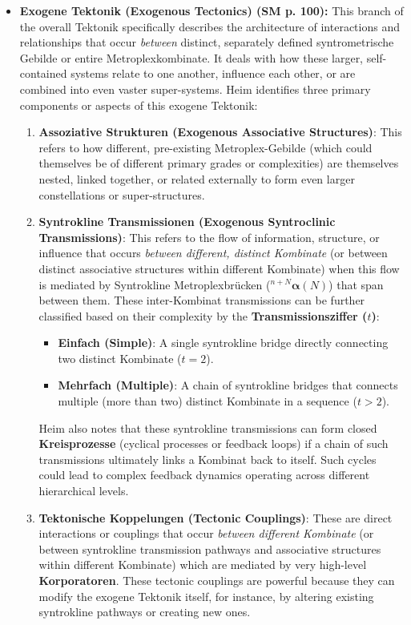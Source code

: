 \documentclass[12pt]{article}
\newcommand{\syntroklinebruecke}[1]{{}^{#1}\bm{\alpha}}
\begin{document}
\begin{itemize}
    \item \textbf{Exogene Tektonik (Exogenous Tectonics) (SM p. 100):}
    This branch of the overall Tektonik specifically describes the architecture of interactions and relationships that occur \textit{between} distinct, separately defined syntrometrische Gebilde or entire Metroplexkombinate. It deals with how these larger, self-contained systems relate to one another, influence each other, or are combined into even vaster super-systems. Heim identifies three primary components or aspects of this exogene Tektonik:
    \begin{enumerate}
        \item \textbf{Assoziative Strukturen (Exogenous Associative Structures)}: This refers to how different, pre-existing Metroplex-Gebilde (which could themselves be of different primary grades or complexities) are themselves nested, linked together, or related externally to form even larger constellations or super-structures. 
        \item \textbf{Syntrokline Transmissionen (Exogenous Syntroclinic Transmissions)}: This refers to the flow of information, structure, or influence that occurs \textit{between different, distinct Kombinate} (or between distinct associative structures within different Kombinate) when this flow is mediated by Syntrokline Metroplexbrücken (\( \syntroklinebruecke{n+N}(N) \)) that span between them. These inter-Kombinat transmissions can be further classified based on their complexity by the \textbf{Transmissionsziffer (\( t \))}:
        \begin{itemize}
            \item \textbf{Einfach (Simple)}: A single syntrokline bridge directly connecting two distinct Kombinate (\( t=2 \)).
            \item \textbf{Mehrfach (Multiple)}: A chain of syntrokline bridges that connects multiple (more than two) distinct Kombinate in a sequence (\( t > 2 \)).
        \end{itemize}
        Heim also notes that these syntrokline transmissions can form closed \textbf{Kreisprozesse} (cyclical processes or feedback loops) if a chain of such transmissions ultimately links a Kombinat back to itself. Such cycles could lead to complex feedback dynamics operating across different hierarchical levels.
        \item \textbf{Tektonische Koppelungen (Tectonic Couplings)}: These are direct interactions or couplings that occur \textit{between different Kombinate} (or between syntrokline transmission pathways and associative structures within different Kombinate) which are mediated by very high-level \textbf{Korporatoren}. These tectonic couplings are powerful because they can modify the exogene Tektonik itself, for instance, by altering existing syntrokline pathways or creating new ones.
    \end{enumerate}


\end{itemize}
\end{document}
